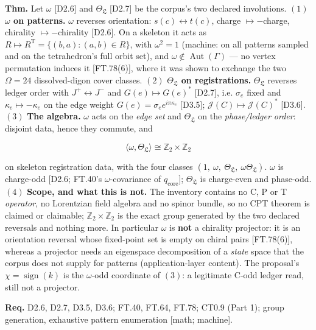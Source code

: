 \begin{theorem}\label{tag:FT-88}
\textbf{Thm.} Let $\omega$ [D2.6] and $\Theta_{\mathfrak L}$ [D2.7] be the corpus's two declared involutions. $(1)$ \textbf{$\omega$ on patterns.} $\omega$ reverses orientation: $s(c)\leftrightarrow t(c)$, charge $\mapsto-$charge, chirality $\mapsto-$chirality [D2.6]. On a skeleton it acts as $R\mapsto R^{\mathrm T}=\{(b,a):(a,b)\in R\}$, with $\omega^2=1$ (machine: on all patterns sampled and on the tetrahedron's full orbit set), and $\omega\notin\operatorname{Aut}(\Gamma)$ — no vertex permutation induces it [FT.78(6)], where it was shown to exchange the two $\Omega=24$ dissolved-digon cover classes. $(2)$ \textbf{$\Theta_{\mathfrak L}$ on registrations.} $\Theta_{\mathfrak L}$ reverses ledger order with $J^+\leftrightarrow J^-$ and $G(e)\mapsto G(e)^\ast$ [D2.7], i.e. $\sigma_e$ fixed and $\kappa_e\mapsto-\kappa_e$ on the edge weight $G(e)=\sigma_e e^{i\pi\kappa_e}$ [D3.5]; $\mathcal J(C)\mapsto\mathcal J(C)^\ast$ [D3.6]. $(3)$ \textbf{The algebra.} $\omega$ acts on the \textit{edge set} and $\Theta_{\mathfrak L}$ on the \textit{phase/ledger order}: disjoint data, hence they commute, and

\[
\langle\omega,\Theta_{\mathfrak L}\rangle\cong\mathbb Z_2\times\mathbb Z_2
\]

on skeleton registration data, with the four classes $(1,\ \omega,\ \Theta_{\mathfrak L},\ \omega\Theta_{\mathfrak L})$. $\omega$ is charge-odd [D2.6; FT.40's $\omega$-covariance of $q_{\mathrm{core}}$]; $\Theta_{\mathfrak L}$ is charge-even and phase-odd. $(4)$ \textbf{Scope, and what this is not.} The inventory contains no C, P or T \textit{operator}, no Lorentzian field algebra and no spinor bundle, so no CPT theorem is claimed or claimable; $\mathbb Z_2\times\mathbb Z_2$ is the exact group generated by the two declared reversals and nothing more. In particular $\omega$ is \textbf{not} a chirality projector: it is an orientation reversal whose fixed-point set is empty on chiral pairs [FT.78(6)], whereas a projector needs an eigenspace decomposition of a \textit{state} space that the corpus does not supply for patterns (application-layer content). The proposal's $\chi=\operatorname{sign}(k)$ is the $\omega$-odd coordinate of $(3)$: a legitimate C-odd ledger read, still not a projector.

\textbf{Req.} D2.6, D2.7, D3.5, D3.6; FT.40, FT.64, FT.78; CT0.9 (Part 1); group generation, exhaustive pattern enumeration [math; machine].


\end{theorem}
